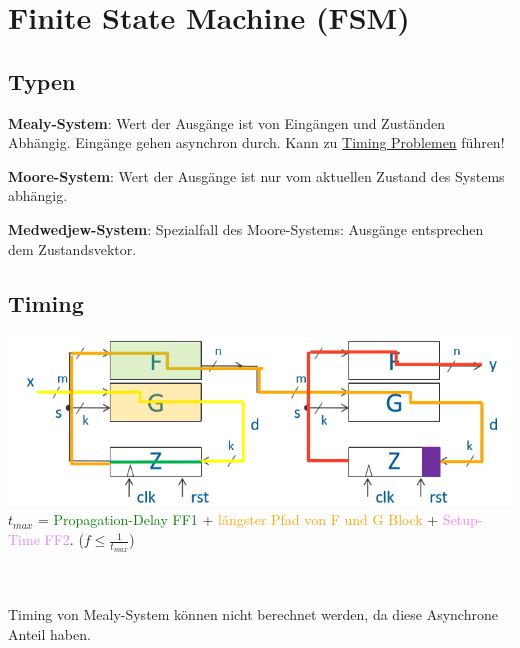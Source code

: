 \section{Finite State Machine (FSM)}
\subsection{Typen}
\noindent\textbf{Mealy-System}: Wert der Ausgänge ist von Eingängen und Zuständen Abhängig. Eingänge gehen asynchron durch. Kann zu \underline{Timing Problemen} führen!

\noindent\textbf{Moore-System}: Wert der Ausgänge ist nur vom aktuellen Zustand des Systems abhängig.

\noindent\textbf{Medwedjew-System}: Spezialfall des Moore-Systems: Ausgänge entsprechen dem Zustandsvektor. \\

\subsection{Timing}
\begin{minipage}{\columnwidth}	
	\includegraphics[width=0.8\columnwidth,keepaspectratio=true]{./Images/timingff.png}\\

	$t_{max}$ = \textcolor{green}{Propagation-Delay FF1} + \textcolor{orange}{längster Pfad von F und G Block} + \textcolor{violet}{Setup-Time FF2}. ($f \leq \frac{1}{t_{max}}$)

\end{minipage}
\\ \\
\noindent Timing von Mealy-System können nicht berechnet werden, da diese Asynchrone Anteil haben.